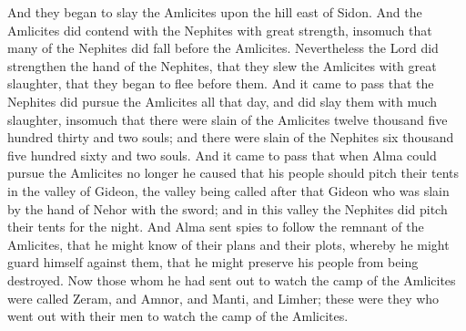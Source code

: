 And they began to slay the Amlicites upon the hill east of Sidon. And the Amlicites did contend with the Nephites with great strength, insomuch that many of the Nephites did fall before the Amlicites.
\bverse \iffalse Nevertheless the Lord did strengthen the hand of the Nephites, that they slew the Amlicites with great slaughter, that they began to flee before them. \fi
Nevertheless the Lord did strengthen the hand of the Nephites, that they slew the Amlicites with great slaughter, that they began to flee before them.
\bverse \iffalse And it came to pass that the Nephites did pursue the Amlicites all that day, and did slay them with much slaughter, insomuch that there were slain of the Amlicites twelve thousand five hundred thirty and two souls; and there were slain of the Nephites six thousand five hundred sixty and two souls. \fi
And it came to pass that the Nephites did pursue the Amlicites all that day, and did slay them with much slaughter, insomuch that there were slain of the Amlicites twelve thousand five hundred thirty and two souls; and there were slain of the Nephites six thousand five hundred sixty and two souls.
\bverse \iffalse And it came to pass that when Alma could pursue the Amlicites no longer he caused that his people should pitch their tents in the valley of Gideon, the valley being called after that Gideon who was slain by the hand of Nehor with the sword; and in this valley the Nephites did pitch their tents for the night. \fi
And it came to pass that when Alma could pursue the Amlicites no longer he caused that his people should pitch their tents in the valley of Gideon, the valley being called after that Gideon who was slain by the hand of Nehor with the sword; and in this valley the Nephites did pitch their tents for the night.
\bverse \iffalse And Alma sent spies to follow the remnant of the Amlicites, that he might know of their plans and their plots, whereby he might guard himself against them, that he might preserve his people from being destroyed. \fi
And Alma sent spies to follow the remnant of the Amlicites, that he might know of their plans and their plots, whereby he might guard himself against them, that he might preserve his people from being destroyed.
\bverse \iffalse Now those whom he had sent out to watch the camp of the Amlicites were called Zeram, and Amnor, and Manti, and Limher; these were they who went out with their men to watch the camp of the Amlicites. \fi
Now those whom he had sent out to watch the camp of the Amlicites were called Zeram, and Amnor, and Manti, and Limher; these were they who went out with their men to watch the camp of the Amlicites.
